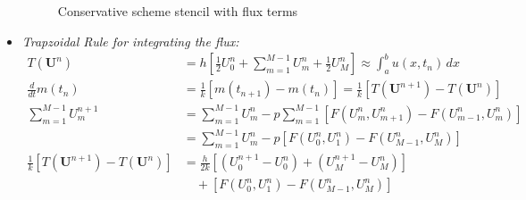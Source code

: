 \begin{itemize}
\begin{figure}[H]
          \caption{Conservative scheme stencil with flux terms}
        \end{figure}
  \item \emph{Trapzoidal Rule for integrating the flux:}
        \begin{align*}
          T(\symbf{U}^n)                                                 & = h \left[ \frac{1}{2}U_0^n + \sum_{m=1}^{M-1} U_m^n + \frac{1}{2} U_M^n \right] \approx \int_a^b u(x,t_n) \, dx  \\
          \frac{d}{dt} m(t_n)                                            & = \frac{1}{k} \left[ m(t_{n+1}) - m(t_n) \right] = \frac{1}{k} \left[ T(\symbf{U}^{n+1}) - T(\symbf{U}^n) \right] \\
          \sum_{m=1}^{M-1} U_m^{n+1}                                     & = \sum_{m=1}^{M-1} U_m^n - p \sum_{m=1}^{M-1} \left[ F(U_m^n, U_{m+1}^n) - F(U_{m-1}^n, U_m^n) \right]            \\
                                                                         & = \sum_{m=1}^{M-1} U_m^n - p \left[F(U_0^n, U_1^n) - F(U_{M-1}^n, U_M^n)\right]                                   \\
          \tfrac{1}{k} \left[T(\symbf{U}^{n+1}) - T(\symbf{U}^n) \right] & = \tfrac{h}{2k} \left[(U_0^{n+1} - U_0^n) + (U_M^{n+1} - U_M^n)\right]                                            \\
                                                                         & \quad + \left[F(U_0^n, U_1^n) - F(U_{M-1}^n, U_M^n)\right]                                                        \\
        \end{align*}
\end{itemize}

